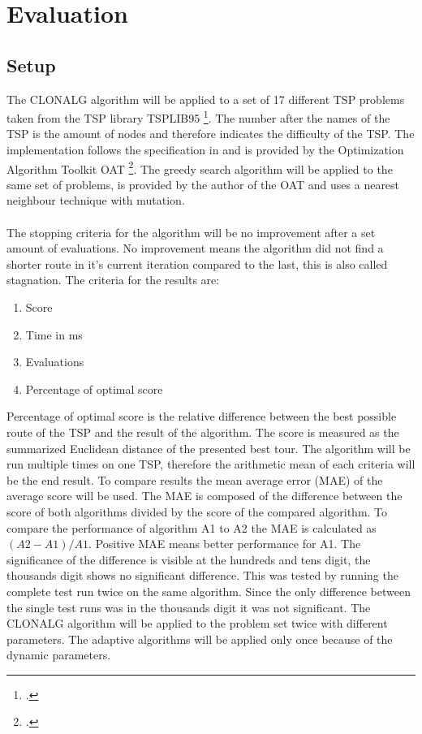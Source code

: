 \chapter{Evaluation}
\label{chap:eva}
\section{Setup}
The CLONALG algorithm will be applied to a set of 17 different TSP problems taken from the TSP library TSPLIB95 \footcite[https://www.iwr.uni-heidelberg.de/groups/comopt/software/TSPLIB95/]{tsplib}. The number after the names of the TSP is the amount of nodes and therefore indicates the difficulty of the TSP. The implementation follows the specification in \cite{DEC02} and is provided by the Optimization Algorithm Toolkit OAT \footcite[http://optalgtoolkit.sourceforge.net/]{oat}. The greedy search algorithm will be applied to the same set of problems, is provided by the author of the OAT and uses a nearest neighbour technique with mutation.\\\\ 
The stopping criteria for the algorithm will be no improvement after a set amount of evaluations. No improvement means the algorithm did not find a shorter route in it's current iteration compared to the last, this is also called stagnation. 
The criteria for the results are:
\begin{enumerate}
	\item 	Score
	\item 	Time in ms
	\item 	Evaluations	
	\item  	Percentage of optimal score
\end{enumerate}
Percentage of optimal score is the relative difference between the best possible route of the TSP and the result of the algorithm. The score is measured as the summarized Euclidean distance of the presented best tour. The algorithm will be run multiple times on one TSP, therefore the arithmetic mean of each criteria will be the end result. To compare results the mean average error (MAE) of the average score will be used. The MAE is composed of the difference between the score of both algorithms divided by the score of the compared algorithm. To compare the performance of algorithm A1 to A2 the MAE is calculated as $(A2-A1)/A1$. Positive MAE means better performance for A1. The significance of the difference is visible at the hundreds and tens digit, the thousands digit shows no significant difference. This was tested by running the complete test run twice on the same algorithm. Since the only difference between the single test runs was in the thousands digit it was not significant. The CLONALG algorithm will be applied to the problem set twice with different parameters. The adaptive algorithms will be applied only once because of the dynamic parameters.
